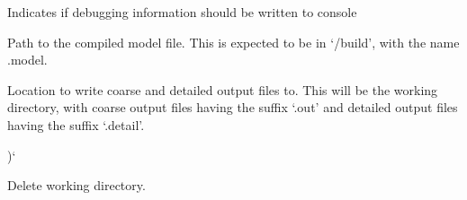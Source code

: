 \documentclass[letterpaper,10pt,english]{sphinxmanual}
\begin{document}
\begin{fulllineitems}
\begin{fulllineitems}
\label{\detokenize{bcmdModel:bayescmd.bcmdModel.bcmd_model.ModelBCMD.debug}}
 \textendash{} Indicates if debugging information should be written to console

\end{fulllineitems}


\begin{fulllineitems}
\label{\detokenize{bcmdModel:bayescmd.bcmdModel.bcmd_model.ModelBCMD.program}}
 \textendash{} Path to the compiled model file. This is expected to be in
‘{\hyperref[\detokenize{bcmdModel:bayescmd.bcmdModel.bcmd_model.ModelBCMD.basedir}]{}}/build’, with the name {\hyperref[\detokenize{bcmdModel:bayescmd.bcmdModel.bcmd_model.ModelBCMD.model_name}]{}}.model.

\end{fulllineitems}



\begin{fulllineitems}
 \textendash{} Location to write coarse and detailed output files to. This will be
the working directory, with coarse output files having the suffix
‘.out’ and detailed output files having the suffix ‘.detail’.

\end{fulllineitems}


\begin{fulllineitems}
\label{\detokenize{bcmdModel:bayescmd.bcmdModel.bcmd_model.ModelBCMD.output_dict}}
){}`

\end{fulllineitems}


\begin{fulllineitems}
\label{\detokenize{bcmdModel:bayescmd.bcmdModel.ModelBCMD._cleanupTemp}}
Delete working directory.


\end{fulllineitems}
\end{fulllineitems}
\end{document}
